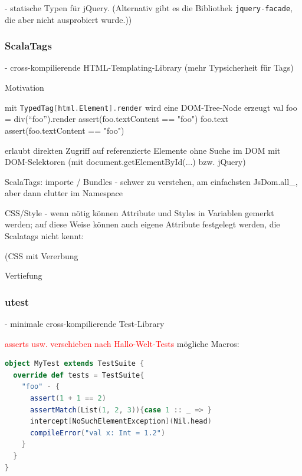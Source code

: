 \documentclass[a4paper, 12pt, hidelinks, listof=totoc, listoftables=totoc, bibliography=totoc]{scrreprt}
\newcommand{\code}[1]{\lstinline[language=Scala, style=inline]|#1|}
\newcommand{\scala}[1]{\lstinline[language=Scala, style=inline]|#1|}
\newcommand{\TODO}[1]{\textcolor{red}{#1}\newline}
\begin{document}
- statische Typen für jQuery. (Alternativ gibt es die Bibliothek \code{jquery-facade}, die aber nicht ausprobiert wurde.))

\subsubsection{ScalaTags}

- cross-kompilierende HTML-Templating-Library (mehr Typsicherheit für Tags)

Motivation



mit \scala{TypedTag[html.Element].render} wird eine \ac{DOM}-Tree-Node erzeugt
  val foo = div("`foo"').render
  assert(foo.textContent == "foo")
  foo.text
  assert(foo.textContent == "foo")

erlaubt direkten Zugriff auf referenzierte Elemente ohne Suche im \ac{DOM} mit \ac{DOM}-Selektoren (mit document.getElementById(...) bzw. jQuery)

ScalaTags: importe / Bundles - schwer zu verstehen, am einfachsten JsDom.all\_, aber dann clutter im Namespace

CSS/Style - wenn nötig können Attribute und Styles in Variablen gemerkt werden; auf diese Weise können auch eigene Attribute festgelegt werden, die Scalatags nicht kennt:

(CSS mit Vererbung

Vertiefung


\subsubsection{utest}

- minimale cross-kompilierende Test-Library

\TODO{asserts usw. verschieben nach Hallo-Welt-Tests}
mögliche Macros:
\begin{lstlisting}[language=Scala]
object MyTest extends TestSuite {
  override def tests = TestSuite{
    "foo" - {
      assert(1 + 1 == 2)
      assertMatch(List(1, 2, 3)){case 1 :: _ => }
      intercept[NoSuchElementException](Nil.head)
      compileError("val x: Int = 1.2")
    }
  }
}
\end{lstlisting}
\end{document}
